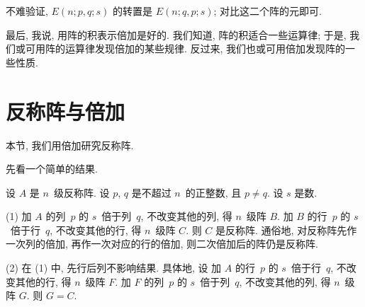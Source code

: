 不难验证, \(E(n; p, q; s)\) 的转置是
\(E(n; q, p; s)\);
对比这二个阵的元即可.

最后, 我说, 用阵的积表示倍加是好的.
我们知道, 阵的积适合一些运算律;
于是, 我们或可用阵的运算律发现倍加的某些规律.
反过来, 我们也或可用倍加发现阵的一些性质.

\section{反称阵与倍加}

本节, 我们用倍加研究反称阵.

先看一个简单的结果.

\begin{theorem}
    设 \(A\) 是 \(n\)~级反称阵.
    设 \(p\), \(q\) 是不超过 \(n\)~的正整数,
    且 \(p \neq q\).
    设 \(s\) 是数.

    (1)
    加 \(A\) 的列~\(p\) 的 \(s\)~倍于列~\(q\),
    不改变其他的列, 得 \(n\)~级阵 \(B\).
    加 \(B\) 的行~\(p\) 的 \(s\)~倍于行~\(q\),
    不改变其他的行, 得 \(n\)~级阵 \(C\).
    则 \(C\) 是反称阵.
    通俗地,
    对反称阵先作一次列的倍加,
    再作一次对应的行的倍加,
    则二次倍加后的阵仍是反称阵.

    (2)
    在 (1) 中, 先行后列不影响结果.
    具体地, 设%
    加 \(A\) 的行~\(p\) 的 \(s\)~倍于行~\(q\),
    不改变其他的行, 得 \(n\)~级阵 \(F\).
    加 \(F\) 的列~\(p\) 的 \(s\)~倍于列~\(q\),
    不改变其他的列, 得 \(n\)~级阵 \(G\).
    则 \(G = C\).
\end{theorem}

